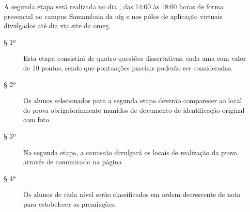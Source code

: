 \begin{article}
  A segunda etapa será realizada no dia \phaseTwo, das 14:00 às 18:00 horas
  de forma presencial no campus Samambaia da \acrshort{ufg} e nos pólos de
  aplicação virtuais divulgados até dia \remoteBasesDisclosureDate{} via site
  da \acrshort{omeg}.
  \begin{description}
    \item[§ 1º]
      Esta etapa consistirá de quatro questões dissertativas, cada uma com
      valor de 10 pontos, sendo que pontuações parciais poderão ser
      consideradas.
    \item[§ 2º]
      Os alunos selecionados para a segunda etapa deverão comparecer ao
      local de prova obrigatoriamente munidos de documento de identificação
      original com foto.
    \item[§ 3º]
      Na segunda etapa, a comissão divulgará os locais de realização da prova
      através de comunicado na página
      \begin{center}
        \homepage
      \end{center}
    \item[§ 4º]
      Os alunos de cada nível serão classificados em ordem decrescente de
      nota para estabelecer as premiações.
  \end{description}
\end{article}
